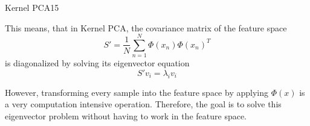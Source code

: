 \begin{questions}
\begin{question}[bonus]{Kernel PCA}{15}
\begin{answer}
This means, that in Kernel PCA, the covariance matrix of the feature space 
\[S'=\frac{1}{N} \sum_{n=1}^{N} \Phi(x_n) \Phi(x_n)^T\]
is diagonalized by solving its eigenvector equation \[S'v_i = \lambda_i v_i\]

However, transforming every sample into the feature space by applying $\Phi(x)$ is a very computation intensive operation. Therefore, the goal is to solve this eigenvector problem without having to work in the feature space.  
 
\end{answer}

\end{question}

\end{questions}
